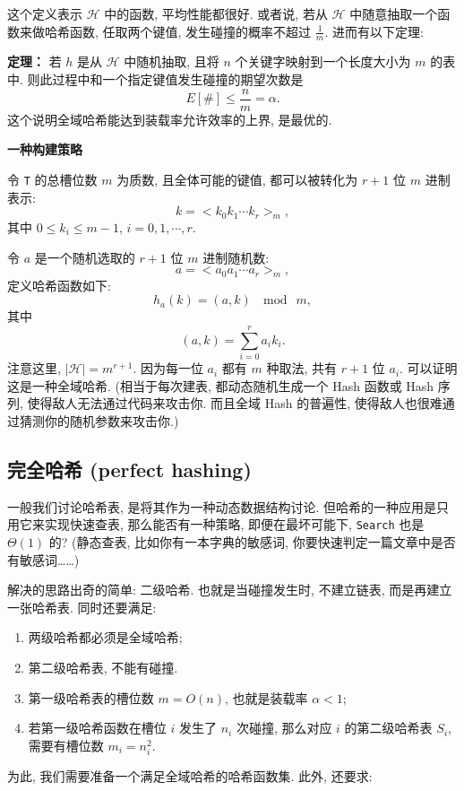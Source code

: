 \documentclass[a4paper]{ctexart}
\theoremstyle{definition}
\theoremstyle{definition}
\begin{document}
这个定义表示 $\mathscr{H}$ 中的函数, 平均性能都很好. 或者说, 若从 $\mathscr{H}$ 
中随意抽取一个函数来做哈希函数, 任取两个键值, 发生碰撞的概率不超过 $\frac{1}{m}$. 
进而有以下定理:

{\bf 定理：} 若 $h$ 是从 $\mathscr{H}$ 中随机抽取, 且将 $n$ 个关键字映射到一个长度大小为 
$m$ 的表中. 则此过程中和一个指定键值发生碰撞的期望次数是
$$ 
E[\#] \leq \frac{n}{m} = \alpha.
$$
这个说明全域哈希能达到装载率允许效率的上界, 是最优的.

{\bf 一种构建策略}

令 \verb|T| 的总槽位数 $m$ 为质数, 且全体可能的键值, 都可以被转化为 $r +
1$ 位 $m$ 进制表示: 
$$ 
k = <k_0 k_1 \cdots k_r>_m, 
$$
其中 $0 \leq k_i \leq m - 1$, $i = 0, 1, \cdots, r$.

令 $a$ 是一个随机选取的 $r + 1$ 位 $m$ 进制随机数: 
$$
a = <a_0 a_1 \cdots a_r>_m,
$$
定义哈希函数如下:
$$
h_a(k) = (a, k)~\mod~m,
$$
其中
$$
(a, k) = \sum_{i = 0}^r a_i k_i.
$$
注意这里, $|\mathscr{H}| = m^{r+1}$.
因为每一位 $a_i$ 都有 $m$ 种取法, 共有 $r + 1$ 位 $a_i$.
可以证明这是一种全域哈希.
(相当于每次建表, 都动态随机生成一个 Hash 函数或 Hash 序列, 使得敌人无法通过代码来攻击你. 
而且全域 Hash 的普遍性, 使得敌人也很难通过猜测你的随机参数来攻击你.)

\subsection{完全哈希 (perfect hashing)}

一般我们讨论哈希表, 是将其作为一种动态数据结构讨论. 但哈希的一种应用是只用它来实现快速查表, 
那么能否有一种策略, 即便在最坏可能下, \verb|Search| 也是 $\Theta(1)$ 的? 
(静态查表, 比如你有一本字典的敏感词, 你要快速判定一篇文章中是否有敏感词……)

解决的思路出奇的简单: 二级哈希. 也就是当碰撞发生时, 不建立链表, 而是再建立一张哈希表. 同时还要满足:

\begin{enumerate}
\item 两级哈希都必须是全域哈希;
\item 第二级哈希表, 不能有碰撞.
\item 第一级哈希表的槽位数 $m = O(n)$, 也就是装载率 $\alpha < 1$;
\item 若第一级哈希函数在槽位 $i$ 发生了 $n_i$ 次碰撞, 那么对应 $i$ 的第二级哈希表 $S_i$, 
需要有槽位数 $m_i = n_i^2$.
\end{enumerate}

为此, 我们需要准备一个满足全域哈希的哈希函数集. 此外, 还要求:
\end{document}
